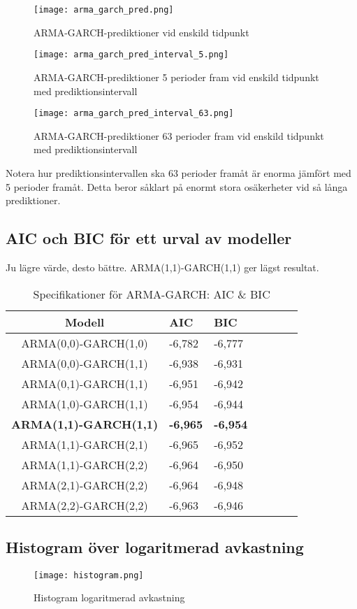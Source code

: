\documentclass[11pt]{article}
\numberwithin{equation}{section}
\numberwithin{table}{section}
\numberwithin{figure}{section}
\begin{document}
\begin{figure}[H]
\caption{ARMA-GARCH-prediktioner vid enskild tidpunkt}
\texttt{[image: arma\_garch\_pred.png]}
\centering
\end{figure}

\begin{figure}[H]
\caption{ARMA-GARCH-prediktioner 5 perioder fram vid enskild tidpunkt med prediktionsintervall}
\texttt{[image: arma\_garch\_pred\_interval\_5.png]}
\centering
\end{figure}

\begin{figure}[H]
\caption{ARMA-GARCH-prediktioner 63 perioder fram vid enskild tidpunkt med prediktionsintervall}
\texttt{[image: arma\_garch\_pred\_interval\_63.png]}
\centering
\end{figure}
Notera hur prediktionsintervallen ska 63 perioder framåt är enorma jämfört med 5 perioder framåt. Detta beror såklart på enormt stora osäkerheter vid så långa prediktioner.

\subsection{AIC och BIC för ett urval av modeller}
Ju lägre värde, desto bättre. ARMA(1,1)-GARCH(1,1) ger lägst resultat.

\begin{table}[H]
\caption{Specifikationer för ARMA-GARCH: AIC \& BIC}
\begin{tabularx}{\textwidth}{c *{6}{Y}}
\toprule
Modell  & AIC & BIC  \\
\hline

ARMA(0,0)-GARCH(1,0)            & -6,782                &   -6,777     \\

ARMA(0,0)-GARCH(1,1)            & -6,938         & -6,931    \\


ARMA(0,1)-GARCH(1,1)            & -6,951         & -6,942   \\

ARMA(1,0)-GARCH(1,1)           & -6,954         & -6,944   \\


\textbf{ARMA(1,1)-GARCH(1,1)}           & \textbf{-6,965}          & \textbf{-6,954}
    \\ 

ARMA(1,1)-GARCH(2,1)           & -6,965         & -6,952   \\ 

ARMA(1,1)-GARCH(2,2)           & -6,964        & -6,950
   \\ 

ARMA(2,1)-GARCH(2,2)           &-6,964        & -6,948    \\ 

ARMA(2,2)-GARCH(2,2)           & -6,963         &  -6,946
   \\ 

\bottomrule
\end{tabularx}
\end{table}

\subsection{Histogram över logaritmerad avkastning}
\begin{figure}[H]
\caption{Histogram logaritmerad avkastning}
\texttt{[image: histogram.png]}
\centering
\end{figure}
\end{document}
